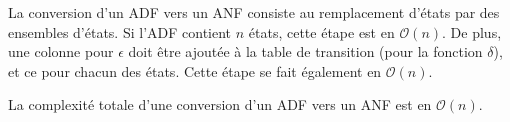 \begin{complexity}
	La conversion d'un ADF \automaton vers un ANF consiste au remplacement d'états par des ensembles d'états. Si l'ADF contient $n$ états, cette étape est en $\mathcal{O}(n)$. De plus, une colonne pour $\epsilon$ doit être ajoutée à la table de transition (pour la fonction $\delta$), et ce pour chacun des états. Cette étape se fait également en $\mathcal{O}(n)$.
	
	La complexité totale d'une conversion d'un ADF vers un ANF est en $\mathcal{O}(n)$.
\end{complexity}
